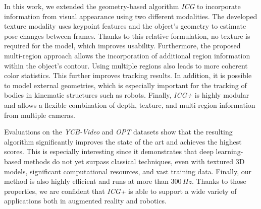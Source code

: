 \documentclass[letterpaper, 10 pt, conference]{ieeeconf}
\begin{document}
In this work, we extended the geometry-based algorithm \textit{ICG} to incorporate information from visual appearance using two different modalities.
The developed texture modality uses keypoint features and the object's geometry to estimate pose changes between frames.
Thanks to this relative formulation, no texture is required for the model, which improves usability.
Furthermore, the proposed multi-region approach allows the incorporation of additional region information within the object's contour.
Using multiple regions also leads to more coherent color statistics.
This further improves tracking results.
In addition, it is possible to model external geometries, which is especially important for the tracking of bodies in kinematic structures such as robots.
Finally, \textit{ICG+} is highly modular and allows a flexible combination of depth, texture, and multi-region information from multiple cameras.

Evaluations on the \textit{YCB-Video} and \textit{OPT} datasets show that the resulting algorithm significantly improves the state of the art and achieves the highest scores.
This is especially interesting since it demonstrates that deep learning-based methods do not yet surpass classical techniques, even with textured 3D models, significant computational resources, and vast training data.
Finally, our method is also highly efficient and runs at more than $300\,\unit{Hz}$.
Thanks to those properties, we are confident that \textit{ICG+} is able to support a wide variety of applications both in augmented reality and robotics.



  




\end{document}
